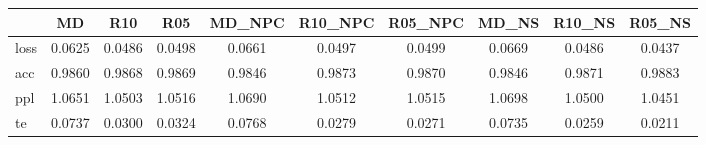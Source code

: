 \begin{tabular}{lccccccccc}
\toprule
 & MD & R10 & R05 & MD_NPC & R10_NPC & R05_NPC & MD_NS & R10_NS & R05_NS \\
\midrule
loss & 0.0625 & 0.0486 & 0.0498 & 0.0661 & 0.0497 & 0.0499 & 0.0669 & 0.0486 & 0.0437 \\
acc & 0.9860 & 0.9868 & 0.9869 & 0.9846 & 0.9873 & 0.9870 & 0.9846 & 0.9871 & 0.9883 \\
ppl & 1.0651 & 1.0503 & 1.0516 & 1.0690 & 1.0512 & 1.0515 & 1.0698 & 1.0500 & 1.0451 \\
te & 0.0737 & 0.0300 & 0.0324 & 0.0768 & 0.0279 & 0.0271 & 0.0735 & 0.0259 & 0.0211 \\
\bottomrule
\end{tabular}
